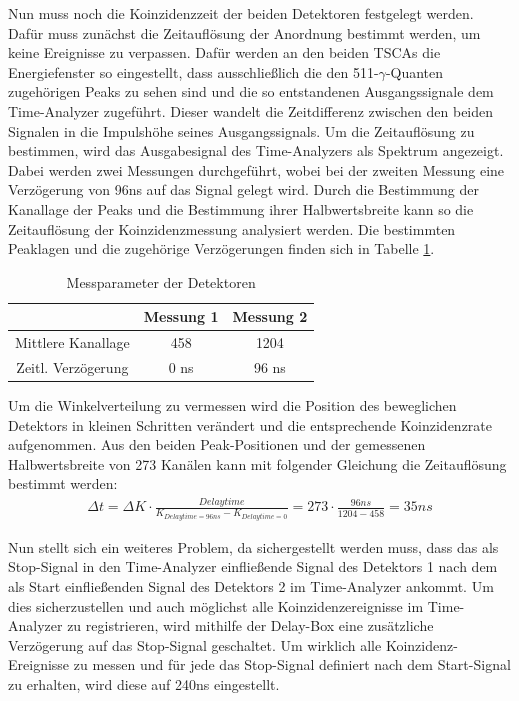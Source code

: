 \documentclass[11pt]{scrartcl}
\begin{document}
Nun muss noch die Koinzidenzzeit der beiden Detektoren festgelegt werden. Dafür muss zunächst die Zeitauflösung der Anordnung bestimmt werden, um keine Ereignisse zu verpassen. Dafür werden an den beiden TSCAs die Energiefenster so eingestellt, dass ausschließlich die den 511-$\gamma$-Quanten zugehörigen Peaks zu sehen sind und die so entstandenen Ausgangssignale dem Time-Analyzer zugeführt. Dieser wandelt die Zeitdifferenz zwischen den beiden Signalen in die Impulshöhe seines Ausgangssignals. Um die Zeitauflösung zu bestimmen, wird das Ausgabesignal des Time-Analyzers als Spektrum angezeigt. Dabei werden zwei Messungen durchgeführt, wobei bei der zweiten Messung eine Verzögerung von 96ns auf das Signal gelegt wird. Durch die Bestimmung der Kanallage der Peaks und die Bestimmung ihrer Halbwertsbreite kann so die Zeitauflösung der Koinzidenzmessung analysiert werden. Die bestimmten Peaklagen und die zugehörige Verzögerungen finden sich in Tabelle \ref{zeit}. 

\begin{table}[h]
	\caption{Messparameter der Detektoren}
	\begin{tabular}{|c|c|c|}
	\hline
	 & Messung 1 & Messung 2\\ \hline
	 Mittlere Kanallage & 458 & 1204\\ \hline
	 Zeitl. Verzögerung & 0 ns & 96 ns\\ \hline
	\end{tabular}
\label{zeit}
\end{table}

Um die Winkelverteilung zu vermessen wird die Position des beweglichen Detektors in kleinen Schritten verändert und die entsprechende Koinzidenzrate aufgenommen. Aus den beiden Peak-Positionen und der gemessenen Halbwertsbreite von 273 Kanälen kann mit folgender Gleichung die Zeitauflösung bestimmt werden:
\begin{align}
\Delta t = \Delta K\cdot\frac{Delaytime}{K_{Delaytime=96ns} - K_{Delaytime=0}} = 273\cdot\frac{96ns}{1204-458}=35ns
\end{align}

Nun stellt sich ein weiteres Problem, da sichergestellt werden muss, dass das als Stop-Signal in den Time-Analyzer einfließende Signal des Detektors 1 nach dem als Start einfließenden Signal des Detektors 2 im Time-Analyzer ankommt. Um dies sicherzustellen und auch möglichst alle Koinzidenzereignisse im Time-Analyzer zu registrieren, wird mithilfe der Delay-Box eine zusätzliche Verzögerung auf das Stop-Signal geschaltet. Um wirklich alle Koinzidenz-Ereignisse zu messen und für jede das Stop-Signal definiert nach 
dem Start-Signal zu erhalten, wird diese auf 240ns eingestellt.
\end{document}
